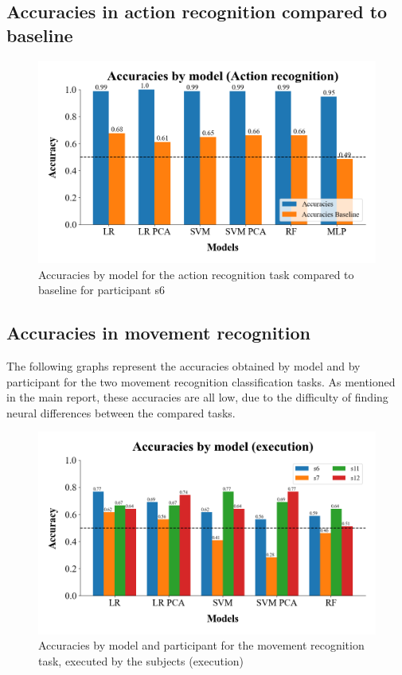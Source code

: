 \documentclass[10pt,conference,compsocconf]{IEEEtran}
\begin{document}
\subsection{Accuracies in action recognition compared to baseline}

\begin{figure}[h!]
    \center
    \includegraphics[width=\linewidth]{../Code/figures/accuracies_ExObs.png}
    \caption{Accuracies by model for the action recognition task compared to baseline for participant s6}
    \label{appfig:accuracies_ExObs}
\end{figure}
\FloatBarrier

\subsection{Accuracies in movement recognition}
The following graphs represent the accuracies obtained by model and by participant for the two movement recognition classification tasks. As mentioned in the main report, these accuracies are all low, due to the difficulty of finding neural differences between the compared tasks.

\begin{figure}[h!]
    \center
    \includegraphics[width=\linewidth]{../Code/figures/accuracies_across_part_ex.png}
    \caption{Accuracies by model and participant for the movement recognition task, executed by the subjects (execution)}
    \label{appfig:accuracies_across_part_ex}
\end{figure}
\FloatBarrier
\end{document}
